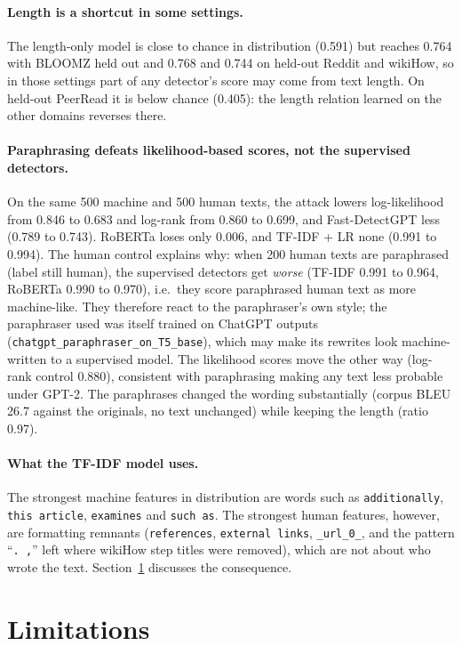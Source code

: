 \documentclass[11pt,a4paper]{article}
\begin{document}
\paragraph{Length is a shortcut in some settings.} The length-only model is close to chance in distribution (0.591)
but reaches 0.764 with BLOOMZ held out and 0.768 and 0.744 on held-out Reddit and wikiHow, so in those settings
part of any detector's score may come from text length. On held-out PeerRead it is below chance (0.405): the
length relation learned on the other domains reverses there.

\paragraph{Paraphrasing defeats likelihood-based scores, not the supervised detectors.} On the same 500 machine
and 500 human texts, the attack lowers log-likelihood from 0.846 to 0.683 and log-rank from 0.860 to 0.699, and
Fast-DetectGPT less (0.789 to 0.743). RoBERTa loses only 0.006, and TF-IDF + LR none (0.991 to 0.994). The human
control explains why: when 200 human texts are paraphrased (label still human), the supervised detectors get
\emph{worse} (TF-IDF 0.991 to 0.964, RoBERTa 0.990 to 0.970), i.e.\ they score paraphrased human text as more
machine-like. They therefore react to the paraphraser's own style; the paraphraser used was itself trained on
ChatGPT outputs (\texttt{chatgpt\_paraphraser\_on\_T5\_base}), which may make its rewrites look machine-written to a
supervised model. The likelihood scores move the other way (log-rank control 0.880), consistent with paraphrasing
making any text less probable under GPT-2. The paraphrases changed the wording substantially (corpus BLEU 26.7
against the originals, no text unchanged) while keeping the length (ratio 0.97).

\paragraph{What the TF-IDF model uses.} The strongest machine features in distribution are words such as
\texttt{additionally}, \texttt{this article}, \texttt{examines} and \texttt{such as}. The strongest human features,
however, are formatting remnants (\texttt{references}, \texttt{external links}, \texttt{\_url\_0\_}, and the
pattern ``\texttt{. ,}'' left where wikiHow step titles were removed), which are not about who wrote the text. Section~\ref{sec:limits} discusses the
consequence.

\section{Limitations}\label{sec:limits}
\end{document}
